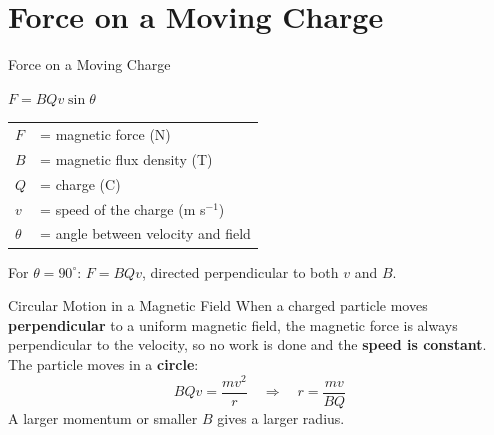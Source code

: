 \begin{center}
\end{center}

\section{Force on a Moving Charge}

\begin{formulabox}{Force on a Moving Charge}
\begin{center}
\Large $F = BQv\sin\theta$
\end{center}
\vspace{0.3em}
\begin{tabular}{@{}ll@{}}
$F$ & = magnetic force (N) \\
$B$ & = magnetic flux density (T) \\
$Q$ & = charge (C) \\
$v$ & = speed of the charge (m s$^{-1}$) \\
$\theta$ & = angle between velocity and field \\
\end{tabular}
\vspace{0.4em}

For $\theta = 90^\circ$: $F = BQv$, directed perpendicular to both $v$ and $B$.
\end{formulabox}

\begin{keybox}{Circular Motion in a Magnetic Field}
When a charged particle moves \textbf{perpendicular} to a uniform magnetic field, the magnetic force is always perpendicular to the velocity, so no work is done and the \textbf{speed is constant}. The particle moves in a \textbf{circle}:
$$BQv = \frac{mv^2}{r} \quad \Rightarrow \quad r = \frac{mv}{BQ}$$
A larger momentum or smaller $B$ gives a larger radius.
\end{keybox}

